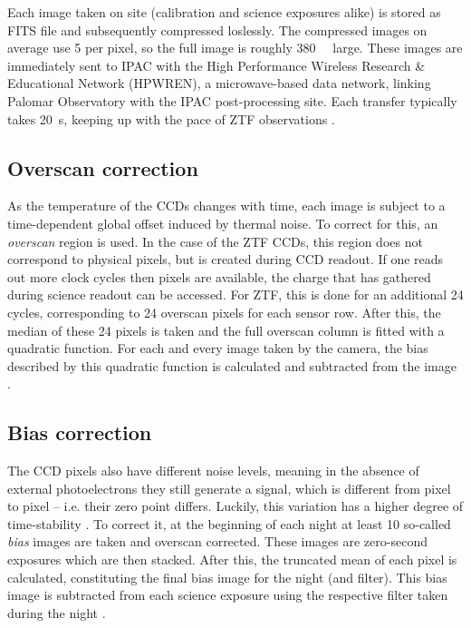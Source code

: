 Each image taken on site (calibration and science exposures alike) is stored as FITS file and subsequently compressed loslessly. The compressed images on average use \SI{5}{\bit} per pixel, so the full image is roughly \SI{380}{\mega\byte} large. These images are immediately sent to IPAC with the High Performance Wireless Research \& Educational Network (HPWREN), a microwave-based data network, linking Palomar Observatory with the IPAC post-processing site. Each transfer typically takes \SI{20}{\second}, keeping up with the pace of ZTF observations \cite{Dekany2020}.

\subsection{Overscan correction}
As the temperature of the CCDs changes with time, each image is subject to a time-dependent global offset induced by thermal noise. To correct for this, an \textit{overscan} region is used. In the case of the ZTF CCDs, this region does not correspond to physical pixels, but is created during CCD readout. If one reads out more clock cycles then pixels are available, the charge that has gathered during science readout can be accessed. For ZTF, this is done for an additional 24 cycles, corresponding to 24 overscan pixels for each sensor row. After this, the median of these 24 pixels is taken and the full overscan column is fitted with a quadratic function. For each and every image taken by the camera, the bias described by this quadratic function is calculated and subtracted from the image \cite{Masci2019a}.

\subsection{Bias correction}
The CCD pixels also have different noise levels, meaning in the absence of external photoelectrons they still generate a signal, which is different from pixel to pixel -- i.e. their zero point differs. Luckily, this variation has a higher degree of time-stability . To correct it, at the beginning of each night at least 10 so-called \textit{bias} images are taken and overscan corrected. These images are zero-second exposures which are then stacked. After this, the truncated mean of each pixel is calculated, constituting the final bias image for the night (and filter). This bias image is subtracted from each science exposure using the respective filter taken during the night \cite{Masci2019a}.

